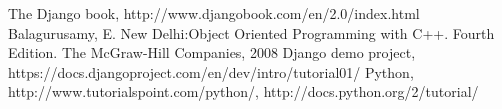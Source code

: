 \begin{thebibliography}{9}
\bibitem{} The Django book, http://www.djangobook.com/en/2.0/index.html
\bibitem{} Balagurusamy, E. New Delhi:Object Oriented
        Programming with C++. Fourth Edition. The McGraw-Hill
        Companies, 2008
\bibitem{} Django demo project, https://docs.djangoproject.com/en/dev/intro/tutorial01/
\bibitem{} Python, http://www.tutorialspoint.com/python/, http://docs.python.org/2/tutorial/
\end{thebibliography}
